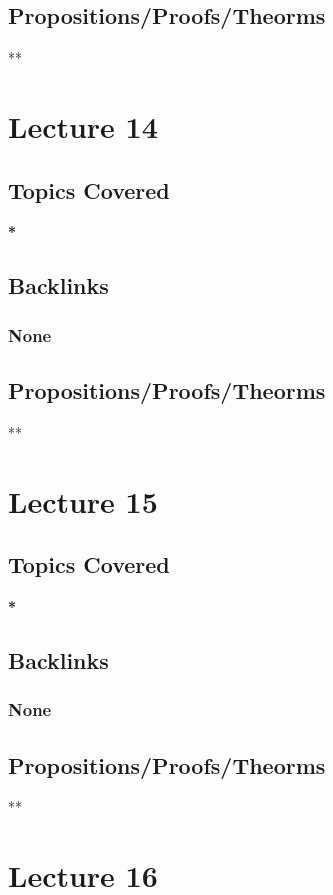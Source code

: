\documentclass[11pt]{article}
\begin{document}
\subsection*{Propositions/Proofs/Theorms}
\label{sec:orgd10f013}
**

\section*{Lecture 14}
\label{sec:orgd2849d5}
\subsection*{Topics Covered}
\label{sec:org20a7157}
\textbf{*}
\subsection*{Backlinks}
\label{sec:orgd26c068}
\subsubsection*{None}
\label{sec:org686084c}
\subsection*{Propositions/Proofs/Theorms}
\label{sec:orgcec89b6}
**

\section*{Lecture 15}
\label{sec:orga27fb96}
\subsection*{Topics Covered}
\label{sec:org30152b6}
\textbf{*}
\subsection*{Backlinks}
\label{sec:org948a652}
\subsubsection*{None}
\label{sec:org6340ea8}
\subsection*{Propositions/Proofs/Theorms}
\label{sec:orgaea8788}
**

\section*{Lecture 16}
\label{sec:org115929e}
\end{document}
